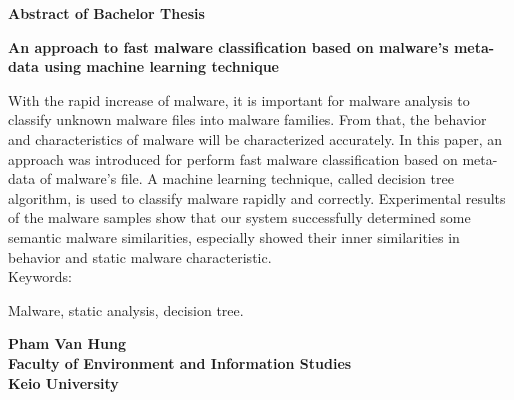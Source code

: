 \begin{center}


\begin{Large}
{\bf Abstract of Bachelor Thesis} \\

\vspace{5mm}

{\bf An approach to fast malware classification based on malware's meta-data using machine learning technique}
\end{Large}
\end{center}

\vspace{0.8cm}
 
  With the rapid increase of malware, it is important for malware analysis to classify unknown malware files into malware families. From that, the behavior and characteristics of malware will be characterized accurately. In this paper, an approach was introduced for perform fast malware classification based on meta-data of malware's file. A machine learning technique, called decision tree algorithm, is used to classify malware rapidly and correctly. Experimental results of the malware samples show that our system successfully determined some semantic malware similarities, especially showed their inner similarities in behavior and static malware characteristic.  \\

Keywords:

Malware, static analysis, decision tree.

\vspace{0.5cm}

\begin{flushright}
{\bf Pham Van Hung}\\
\vspace{2mm}
{\bf Faculty of Environment and Information Studies}\\
{\bf Keio University}\\
\end{flushright}